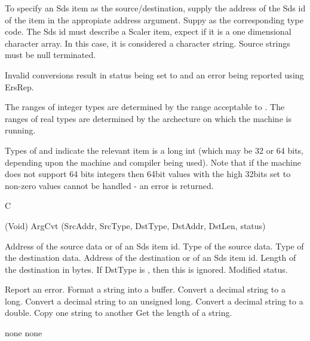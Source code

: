 \begin{manroutinedescription}
	
	To specify an Sds item as the source/destination, supply the
	address of the Sds id of the item in the appropiate address argument.
	Suppy {} as the corresponding type code.  The Sds id must
	describe a Scaler item, expect if it is a one dimensional
	character array.  In this case, it is considered a character string.
	Source strings must be null terminated.

	Invalid conversions result in status being set to {} %
and
	an error being reported using ErsRep.

	The ranges of integer types are determined by the range acceptable to
	{}.  The ranges of real types are determined by the archecture
	on which the machine is running.
 

	Types of {} and {} indicate the relevant %
item is a long
	int (which may be 32 or 64 bits, depending upon the machine and
	compiler being used).  Note that if the machine does not support
	64 bits integers then 64bit values with the high 32bits set to
	non-zero values cannot be handled - an error is returned.

      C

      (Void) {\mantt{=}} ArgCvt (SrcAddr, SrcType, DstType, DstAddr, DstLen, %
status)

\begin{manparametertable}
     Address of the %
source data or of an
					Sds item id.
 Type of the source data.
 Type of the destination %
data.
     Address of the %
destination or of an
					Sds item id.
	     Length of the destination in %
bytes.
			    If DstType  is {}, then this is ignored.
 Modified status.

\end{manparametertable}
\begin{manfunctiontable}
   Report an error.
   Format a string into a buffer.
  Convert a decimal string to a long.
  Convert a decimal string to an %
unsigned long.
  Convert a decimal string to a double.
  Copy one string to another
  Get the length of a string.
\end{manfunctiontable}
      none
      none

\end{manroutinedescription}
